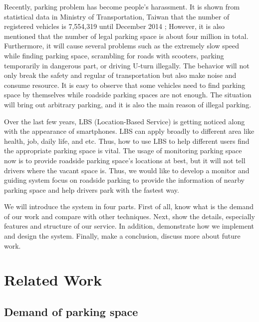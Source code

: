 \documentclass[runningheads,a4paper]{llncs}
\begin{document}
Recently, parking problem has become people's harassment. 
It is shown from statistical data in Ministry of
Transportation, Taiwan that the number of registered vehicles is
7,554,319 until December 2014 \cite{motc}; However, it is also mentioned that
the number of legal parking space is about four million in total. 
Furthermore, it will cause several problems such as the extremely slow
speed while finding parking space, scrambling for roads with scooters,
parking temporarily in dangerous part, or driving U-turn illegally. The
behavior will not only break the safety and regular of transportation
but also make noise and consume resource. 
It is easy to observe that some vehicles need to find parking space by
themselves while roadside parking spaces are not enough. The situation
will bring out arbitrary parking, and it is also the main reason of
illegal parking. 

Over the last few years, LBS (Location-Based Service) \cite{LBS} is getting noticed along with
the appearance of smartphones. LBS can apply broadly to different area
like health, job, daily life, and etc. Thus, how to use LBS to help
different users find the appropriate parking space is vital. The usage
of monitoring parking space now is to provide roadside parking space's
locations at best, but it will not tell drivers where the vacant space
is. Thus, we would like to develop a monitor and guiding system focus on
roadside parking to provide the information of nearby parking space and
help drivers park with the fastest way.

We will introduce the system in four parts. First of all, know what is
the demand of our work and compare with other techniques. Next, show the
details, especially features and structure of our service. In addition,
demonstrate how we implement and design the system. Finally, make a
conclusion, discuss more about future work.


\section{Related Work}\label{sec:relatedWork}

%
\subsection{Demand of parking space}
%
\end{document}
